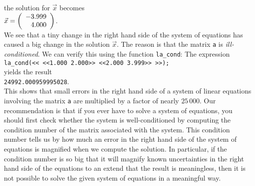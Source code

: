the solution for $\vec{x}$ becomes
\\[0.2cm]
\hspace*{1.3cm}
$\vec{x}  = 
 \left(
   \begin{array}[c]{r}
     -3.999 \\ 4.000
   \end{array}
  \right)
$.
\\[0.2cm]
We see that a tiny change in the right hand side of the system of equations has caused a big change
in the solution $\vec{x}$.  The reason is that the matrix \texttt{a} is \emph{ill-conditioned}.
We can verify this using the function \texttt{la\_cond}:  The expression
\\[0.2cm]
\hspace*{1.3cm}
\texttt{la\_cond(<< <<1.000 2.000>> <<2.000 3.999>> >>);}
\\[0.2cm]
yields the result 
\\[0.2cm]
\hspace*{1.3cm}
\texttt{24992.000959995028}.
\\[0.2cm]
This shows that small errors in the right hand side of a system of linear equations involving the
matrix \texttt{a} are multiplied by a factor of nearly $25\,000$.  Our recommendation is that if you
ever have to solve a system of equations, you should first check whether the system is
well-conditioned by computing the condition number of the matrix associated with the system.  This 
condition number tells us by how much an error in the right hand side of the system of equations is
magnified when we compute the solution.  In particular, if the condition number is so big that it
will magnify known uncertainties in  the right hand side of the equations to an extend that the
result is meaningless, then it is not possible to solve the given system of equations in a meaningful
way. 


